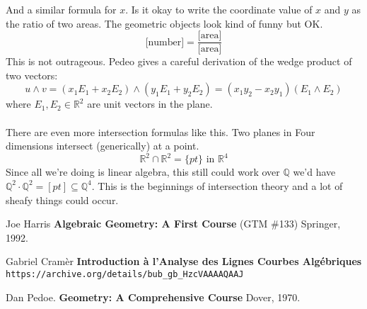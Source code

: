 \documentclass[12pt]{article}
\begin{document}
And a similar formula for $x$.  Is it okay to write the coordinate value of $x$ and $y$ as the ratio of two areas.  The geometric objects look kind of funny but OK.
$$ \text{[number]} = \frac{\text{[area]}}{\text{[area]}} $$
This is not outrageous.  Pedeo gives a careful derivation of the wedge product of two vectors:
$$ u \wedge v = (x_1 E_1 + x_2 E_2) \wedge (y_1 E_1 + y_2 E_2) = (x_1 y_2 - x_2 y_1) (E_1 \wedge E_2) $$
where $E_1, E_2 \in \mathbb{R}^2$ are unit vectors in the plane.  \\ \\
There are even more intersection formulas like this.  Two planes in Four dimensions intersect (generically) at a point. 
$$ \mathbb{R}^2 \cap \mathbb{R}^2 = \{ pt \} \text{ in } \mathbb{R}^4 $$
Since all we're doing is linear algebra, this still could work over $\mathbb{Q}$ we'd have $\mathbb{Q}^2 \cdot \mathbb{Q}^2 = [pt] \subseteq \mathbb{Q}^4$.  This is the beginnings of intersection theory and a lot of sheafy things could occur.

\vfill

\begin{thebibliography}{}

\item Joe Harris \textbf{Algebraic Geometry: A First Course} (GTM \#133) Springer, 1992.

\item  Gabriel Cram\`{e}r \textbf{Introduction \`{a} l'Analyse des Lignes Courbes Algébriques} \\ \texttt{https://archive.org/details/bub\_{}gb\_{}HzcVAAAAQAAJ}

\item Dan Pedoe.  \textbf{Geometry: A Comprehensive Course} Dover, 1970.

\end{thebibliography}
\end{document}
